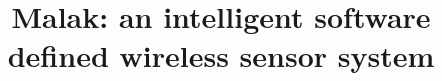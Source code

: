 \documentclass{sig-alternate}
\begin{document}
\title{Malak: an intelligent software defined wireless sensor system}
\author{}


\newcommand{\sdn}{Malak}

\maketitle





%






\end{document}
